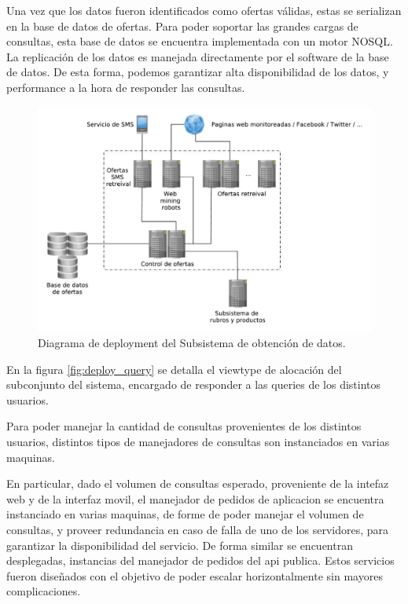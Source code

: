 Una vez que los datos fueron identificados como ofertas válidas, estas se serializan en la base de datos de ofertas. Para poder soportar las grandes cargas de consultas, esta base de datos se encuentra implementada con un motor NOSQL. La replicación de los datos es manejada directamente por el software de la base de datos. De esta forma, podemos garantizar alta disponibilidad de los datos, y performance a la hora de responder las consultas.

\begin{figure}[H]
	\centering
	\includegraphics[width=\textwidth]{graficos/deploy/deploy_obtencion_datos.pdf}
	\caption{Diagrama de deployment del \textsf{Subsistema de obtención de datos}.}
	\label{fig:obtencion_datos}
\end{figure}

En la figura \ref{fig:deploy_query} se detalla el viewtype de alocación del subconjunto del sistema, encargado de responder a las queries de los distintos usuarios.  

Para poder manejar la cantidad de consultas provenientes de los distintos usuarios, distintos tipos de manejadores de consultas son instanciados en varias maquinas. 

En particular, dado el volumen de consultas esperado, proveniente de la intefaz web y de la interfaz movil, el manejador de pedidos de aplicacion se encuentra instanciado en varias maquinas, de forme de poder manejar el volumen de consultas, y proveer redundancia en caso de falla de uno de los servidores, para garantizar la disponibilidad del servicio. De forma similar se encuentran desplegadas, instancias del manejador de pedidos del api publica. Estos servicios fueron dise\~nados con el objetivo de poder escalar horizontalmente sin mayores complicaciones.

